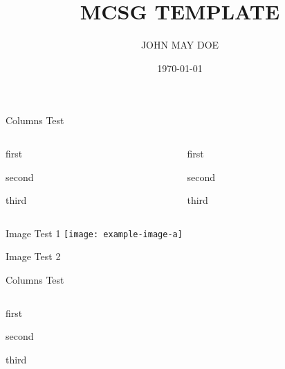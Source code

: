 \documentclass[aspectratio=169]{beamer}
\title[BOTTOM PAGE TITLE \hspace{20mm}\insertframenumber/\inserttotalframenumber]{
    MCSG TEMPLATE
}
\author{JOHN MAY DOE}
\date{\today}
\begin{document}
\begin{frame}
    \titlepage
\end{frame}

\logo{} %

\begin{frame}{Columns Test}
    \begin{columns}
        \begin{column}{0.5\textwidth}
           \begin{wideitemize}
                \item first
                \item second
                \item third
            \end{wideitemize}
        \end{column}
        \begin{column}{0.5\textwidth}  %
            \begin{wideenumerate}
                \item first
                \item second
                \item third
    \end{wideenumerate}
        \end{column}
    \end{columns}
\end{frame}


\begin{frame}{Image Test 1}
    \texttt{[image: example-image-a]}
\end{frame}

\begin{frame}{Image Test 2}
\end{frame}


\begin{frame}{Columns Test}
    \begin{columns}
        \begin{column}{0.5\textwidth}
           \begin{wideitemize}
                \item first
                \item second
                \item third
            \end{wideitemize}
        \end{column}
        \begin{column}{0.5\textwidth}  %
            \begin{center}
             \end{center}
        \end{column}
    \end{columns}
\end{frame}
\end{document}
